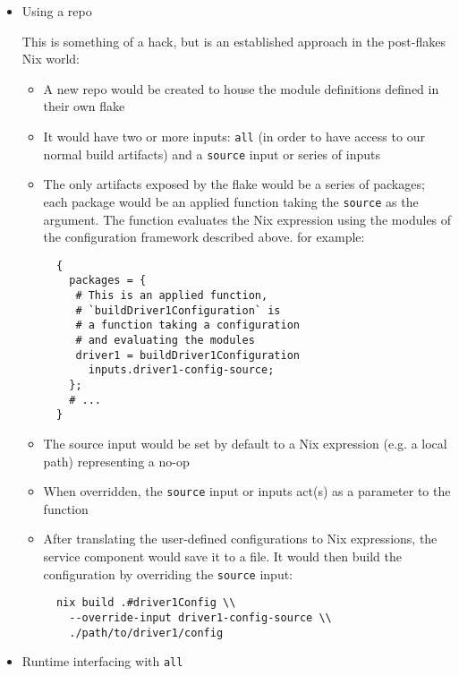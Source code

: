 \documentclass[11pt]{article}
\begin{document}
\begin{itemize}
\item Using a repo
\label{sec:org85a9dc7}

This is something of a hack, but is an established approach in the post-flakes Nix world:
\begin{itemize}
\item A new repo would be created to house the module definitions defined in their own flake
\item It would have two or more inputs: \texttt{all} (in order to have access to our normal build artifacts) and a \texttt{source} input or series of inputs
\item The only artifacts exposed by the flake would be a series of packages; each package would be an applied function taking the \texttt{source} as the argument. The function evaluates the Nix expression using the modules of the configuration framework described above. for example:
\lstset{language=nix,label= ,caption= ,captionpos=b,numbers=none}
\begin{lstlisting}
  {
    packages = {
     # This is an applied function,
     # `buildDriver1Configuration` is
     # a function taking a configuration
     # and evaluating the modules
     driver1 = buildDriver1Configuration
       inputs.driver1-config-source;
    };
    # ...
  }
\end{lstlisting}
\item The source input would be set by default to a Nix expression (e.g. a local path) representing a no-op
\item When overridden, the \texttt{source} input or inputs act(s) as a parameter to the function
\item After translating the user-defined configurations to Nix expressions, the service component would save it to a file. It would then build the configuration by overriding the \texttt{source} input:
\begin{verbatim}
  nix build .#driver1Config \\
    --override-input driver1-config-source \\
    ./path/to/driver1/config
\end{verbatim}
\end{itemize}
\item Runtime interfacing with \texttt{all}
\label{sec:org4d067c0}


\end{itemize}
\end{document}
